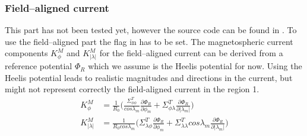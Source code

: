 \subsubsection{Field--aligned current}\label{cap:fldalg_curr}
%
This part has not been tested yet, however the source code can be found in 
. To use the field--aligned part 
the flag   
in   has to be set. 
The magnetospheric current components $K_{\phi}^M$ and 
$K_{|\lambda|}^M$ for the field--aligned current can be derived 
from a reference potential 
$\Phi_R$ which we assume is the Heelis potential for now. Using the
Heelis potential leads to realistic magnitudes and directions 
in the current, but
might not represent correctly the field-aligned current in the region 1.
%
\begin{align}
  K_{\phi}^M       &=  \frac{1}{R_0} \bigl( \frac{\Sigma_{\phi \phi}^T}{cos
   \lambda_m} \frac{\partial \Phi_R}{\partial \phi_m} + 
   \Sigma_{\phi \lambda}^T \frac{\partial \Phi_R}{\partial |\lambda_m|} \bigr) \label{eq:fac_phi}\\
  K_{|\lambda|}^M  &= \frac{1}{R_0 cos \lambda_m} \bigl( \Sigma_{\lambda \phi}^T
    \frac{\partial \Phi_R}{\partial \phi_m} + 
   \Sigma_{\lambda \lambda}^T cos \lambda_m 
   \frac{\partial \Phi_R}{\partial |\lambda_m|} \bigr) \label{eq:fac_lam}
\end{align}
%
%
%

